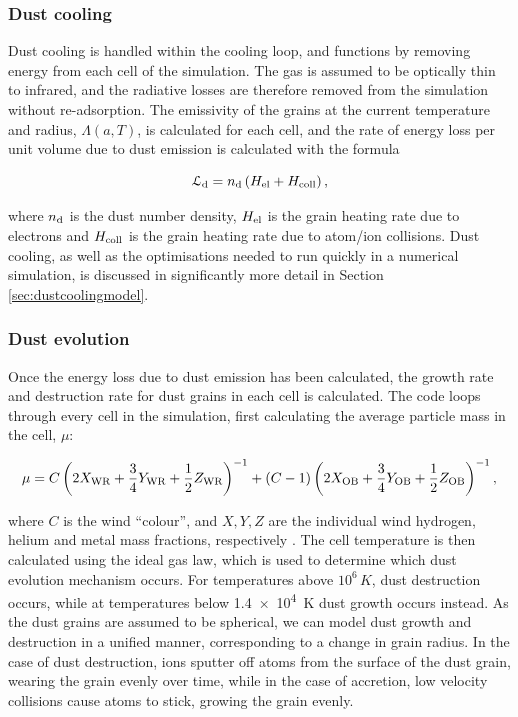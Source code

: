 \subsubsection{Dust cooling}

Dust cooling is handled within the cooling loop, and functions by removing energy from each cell of the simulation.
The gas is assumed to be optically thin to infrared, and the radiative losses are therefore removed from the simulation without re-adsorption.
The emissivity of the grains at the current temperature and radius, $\Lambda(a,T)$, is calculated for each cell, and the rate of energy loss per unit volume due to dust emission is calculated with the formula


\begin{equation}
  \mathcal{L}_\text{d} = n_\text{d} \left( H_\text{el} + H_\text{coll} \right) , 
\end{equation}

\noindent
where $n_\text{d}$ is the dust number density, $H_\text{el}$ is the grain heating rate due to electrons and $H_\text{coll}$ is the grain heating rate due to atom/ion collisions.
Dust cooling, as well as the optimisations needed to run quickly in a numerical simulation, is discussed in significantly more detail in Section \ref{sec:dustcoolingmodel}.

\subsubsection{Dust evolution}

Once the energy loss due to dust emission has been calculated, the growth rate and destruction rate for dust grains in each cell is calculated.
The code loops through every cell in the simulation, first calculating the average particle mass in the cell, $\mu$:

\begin{equation}
  \mu = C \left(2 X_\text{WR} + \frac{3}{4} Y_\text{WR} + \frac{1}{2} Z_\text{WR} \right)^{-1} + (C-1) \left(2 X_\text{OB} + \frac{3}{4} Y_\text{OB} + \frac{1}{2} Z_\text{OB} \right)^{-1} ,
\end{equation}

\noindent
where $C$ is the wind ``colour'', and $X,Y,Z$ are the individual wind hydrogen, helium and metal mass fractions, respectively
\parencite{mihalasStellarAtmospheres1978}.
The cell temperature is then calculated using the ideal gas law, which is used to determine which dust evolution mechanism occurs.
For temperatures above $10^6 \, \si{K}$, dust destruction occurs, while at temperatures below \SI{1.4e4}{K} dust growth occurs instead.
As the dust grains are assumed to be spherical, we can model dust growth and destruction in a unified manner, corresponding to a change in grain radius.
In the case of dust destruction, ions sputter off atoms from the surface of the dust grain, wearing the grain evenly over time, while in the case of accretion, low velocity collisions cause atoms to stick, growing the grain evenly.

